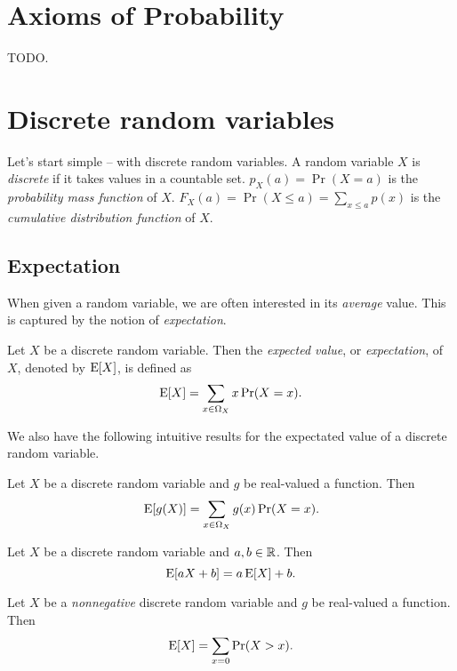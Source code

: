 \documentclass{article}
\begin{document}
\section{Axioms of Probability}

TODO.

\section{Discrete random variables}

Let's start simple -- with discrete random variables.
A random variable $X$ is \emph{discrete} if it takes values in a countable set.
$p_X(a) = \Pr(X = a)$ is the \emph{probability mass function} of $X$.
$F_X(a) = \Pr(X \leq a) = \sum_{x \leq a} p(x)$ is the \emph{cumulative distribution function} of $X$.

\subsection{Expectation}

When given a random variable, we are often interested in its \emph{average} value.
This is captured by the notion of \emph{expectation}.

\begin{definition}
  Let $X$ be a discrete random variable.
  Then the \emph{expected value}, or \emph{expectation}, of $X$, denoted by $\operatorname{E}[X]$, is defined as
  \[
    \operatorname{E}[X] = \sum_{x \in \Omega_X} x \Pr(X = x).
  \]
\end{definition}

We also have the following intuitive results for the expectated value of a discrete random variable.

\begin{proposition}
  Let $X$ be a discrete random variable and $g$ be real-valued a function.
  Then
  \[
    \operatorname{E}[g(X)] = \sum_{x \in \Omega_X} g(x) \Pr(X = x).
  \]
\end{proposition}

\begin{corollary}
  Let $X$ be a discrete random variable and $a, b \in \mathbb{R}$.
  Then
  \[
    \operatorname{E}[a X + b] = a \operatorname{E}[X] + b.
  \]
\end{corollary}

\begin{proposition}
  Let $X$ be a \emph{nonnegative} discrete random variable and $g$ be real-valued a function.
  Then
  \[
    \operatorname{E}[X] = \sum_{x = 0} \Pr(X > x).
  \]
\end{proposition}
\end{document}

